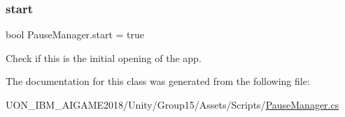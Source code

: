 \subsubsection{\texorpdfstring{start}{start}}
{\footnotesize\ttfamily bool Pause\+Manager.\+start = true\hspace{0.3cm}{\ttfamily [private]}}



Check if this is the initial opening of the app. 



The documentation for this class was generated from the following file\+:\begin{DoxyCompactItemize}
\item 
U\+O\+N\+\_\+\+I\+B\+M\+\_\+\+A\+I\+G\+A\+M\+E2018/\+Unity/\+Group15/\+Assets/\+Scripts/\mbox{\hyperlink{_pause_manager_8cs}{Pause\+Manager.\+cs}}\end{DoxyCompactItemize}
